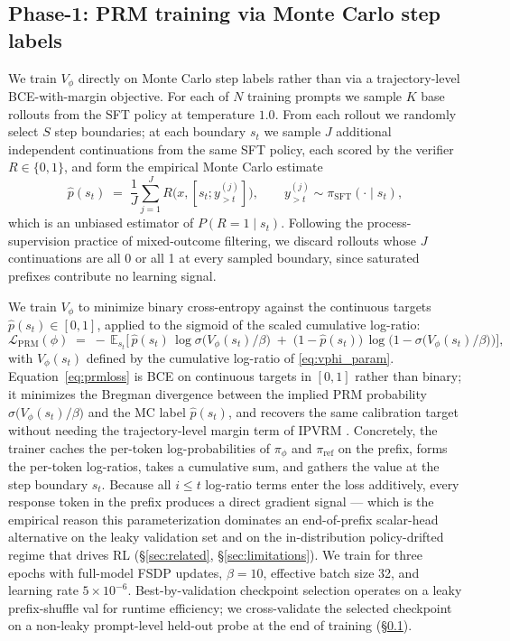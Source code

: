 \documentclass[11pt]{article}
\newcommand{\ipvrm}{IPVRM}
\begin{document}
\subsection{Phase-1: PRM training via Monte Carlo step labels}
\label{sec:phase1}
We train $V_\phi$ directly on Monte Carlo step labels rather than via a
trajectory-level BCE-with-margin objective. For each of $N$ training
prompts we sample $K$ base rollouts from the SFT policy at temperature
$1.0$. From each rollout we randomly select $S$ step boundaries; at each
boundary $s_t$ we sample $J$ additional independent continuations from
the same SFT policy, each scored by the verifier $R \in \{0, 1\}$, and
form the empirical Monte Carlo estimate
\begin{equation}
\label{eq:phat}
\widehat{p}(s_t) \;=\; \frac{1}{J}\sum_{j=1}^{J} R\!\big(x, [s_t; y^{(j)}_{>t}]\big),
\qquad y^{(j)}_{>t}\sim \pi_{\mathrm{SFT}}(\cdot \mid s_t),
\end{equation}
which is an unbiased estimator of $P(R = 1 \mid s_t)$. Following the
process-supervision practice of mixed-outcome filtering, we discard
rollouts whose $J$ continuations are all 0 or all 1 at every sampled
boundary, since saturated prefixes contribute no learning signal.

We train $V_\phi$ to minimize binary cross-entropy against the
continuous targets $\widehat{p}(s_t) \in [0, 1]$, applied to the
sigmoid of the scaled cumulative log-ratio:
\begin{equation}
\label{eq:prmloss}
\mathcal{L}_{\mathrm{PRM}}(\phi) \;=\;
-\,\mathbb{E}_{s_t}\!\Big[\,
\widehat{p}(s_t)\,\log \sigma\!\big(V_\phi(s_t)/\beta\big)
\;+\;
\big(1-\widehat{p}(s_t)\big)\,\log\!\big(1 - \sigma\!\big(V_\phi(s_t)/\beta\big)\big)
\Big],
\end{equation}
with $V_\phi(s_t)$ defined by the cumulative log-ratio
of \eqref{eq:vphi_param}. Equation~\eqref{eq:prmloss} is BCE on
continuous targets in $[0, 1]$ rather than binary; it minimizes the
Bregman divergence between the implied PRM probability
$\sigma\!\big(V_\phi(s_t)/\beta\big)$ and the MC label
$\widehat{p}(s_t)$, and recovers the same calibration target without
needing the trajectory-level margin term of \ipvrm{}
\citep{ipvrm2026}. Concretely, the trainer caches the per-token
log-probabilities of $\pi_\phi$ and $\pi_{\mathrm{ref}}$ on the
prefix, forms the per-token log-ratios, takes a cumulative sum, and
gathers the value at the step boundary $s_t$. Because all $i \le t$
log-ratio terms enter the loss additively, every response token in
the prefix produces a direct gradient signal --- which is the
empirical reason this parameterization dominates an end-of-prefix
scalar-head alternative on the leaky validation set and on the
in-distribution policy-drifted regime that drives RL
(\S\ref{sec:related}, \S\ref{sec:limitations}). We train for three epochs with full-model
FSDP updates, $\beta = 10$, effective batch size 32, and learning
rate $5 \times 10^{-6}$. Best-by-validation checkpoint selection
operates on a leaky prefix-shuffle val for runtime efficiency; we
cross-validate the selected checkpoint on a non-leaky prompt-level
held-out probe at the end of training (\S\ref{sec:phase1}).
\end{document}
